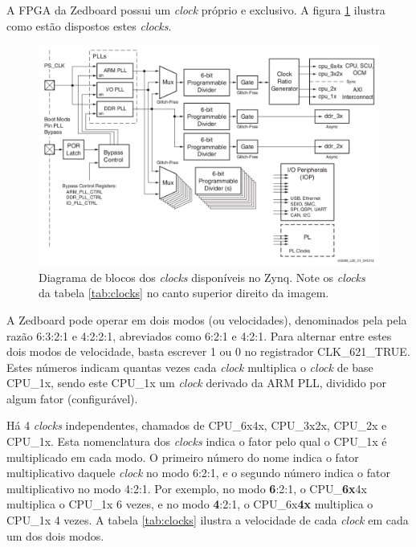 A FPGA da Zedboard possui um \emph{clock} próprio e exclusivo. A figura \ref{fig:clocks} ilustra como estão dispostos estes \emph{clocks}.

\begin{figure}[ht!]
	\centerline{
    \includegraphics[width=13cm]{figuras/clocks}
	}
    \caption{Diagrama de blocos dos \emph{clocks} disponíveis no Zynq. Note os \emph{clocks} da tabela \ref{tab:clocks} no canto superior direito da imagem.}
	\label{fig:clocks}
\end{figure}

A Zedboard pode operar em dois modos (ou velocidades), denominados pela pela razão 6:3:2:1 e 4:2:2:1, abreviados como 6:2:1 e 4:2:1. Para alternar entre estes dois modos de velocidade, basta escrever 1 ou 0 no registrador CLK\_621\_TRUE. Estes números indicam quantas vezes cada \emph{clock} multiplica o \emph{clock} de base CPU\_1x, sendo este CPU\_1x um \emph{clock} derivado da ARM PLL, dividido por algum fator (configurável).

Há 4 \emph{clocks} independentes, chamados de CPU\_6x4x, CPU\_3x2x, CPU\_2x e CPU\_1x. Esta nomenclatura dos \emph{clocks} indica o fator pelo qual o CPU\_1x é multiplicado em cada modo.
O primeiro número do nome indica o fator multiplicativo daquele \emph{clock} no modo 6:2:1, e o segundo número indica o fator multiplicativo no modo 4:2:1.
Por exemplo, no modo \textbf{6}:2:1, o CPU\_\textbf{6x}4x multiplica o CPU\_1x 6 vezes, e no modo \textbf{4}:2:1, o CPU\_6x\textbf{4x} multiplica o CPU\_1x 4 vezes. A tabela \ref{tab:clocks} ilustra a velocidade de cada \emph{clock} em cada um dos dois modos.

